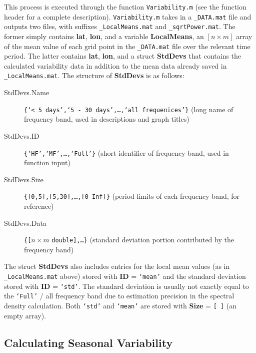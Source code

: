 \documentclass{article}
\begin{document}
This process is executed through the function \texttt{Variability.m} (see the function header for a complete description). \texttt{Variability.m} takes in a \texttt{\_DATA.mat} file and outputs two files, with suffixes \texttt{\_LocalMeans.mat} and \texttt{\_sqrtPower.mat}. The former simply contains \textbf{lat}, \textbf{lon}, and a variable \textbf{LocalMeans}, an $[n\times m]$ array of the mean value of each grid point in the \texttt{\_DATA.mat} file over the relevant time period. The latter contains \textbf{lat}, \textbf{lon}, and a struct \textbf{StdDevs} that contains the calculated variability data in addition to the mean data already saved in \texttt{\_LocalMeans.mat}. The structure of \textbf{StdDevs} is as follows: 
\begin{description}
\item [StdDevs.Name] \texttt{\{`< 5 days',`5 - 30 days',\dots,`all frequenices'\}} (long name of frequency band, used in descriptions and graph titles)
\item [StdDevs.ID] \texttt{\{`HF',`MF',\dots,`Full'\}} (short identifier of frequency band, used in function input)
\item [StdDevs.Size] \texttt{\{[0,5],[5,30],\dots,[0 Inf]\}} (period limits of each frequency band, for reference)
\item [StdDevs.Data] \texttt{\{[}$n\times m$ \texttt{double],\dots\}} (standard deviation portion contributed by the frequency band)
\end{description}

The struct \textbf{StdDevs} also includes entries for the local mean values (as in \texttt{\_LocalMeans.mat} above) stored with \textbf{ID} = \texttt{`mean'} and the standard deviation stored with \textbf{ID} = \texttt{`std'}. The standard deviation is usually not exactly equal to the \texttt{`Full'} / all frequency band due to estimation precision in the spectral density calculation. Both \texttt{`std'} and \texttt{`mean'} are stored with \textbf{Size} = \texttt{[ ]} (an empty array). 

\subsection{Calculating Seasonal Variability}
\label{func:Variability_seasons.m}
\end{document}
